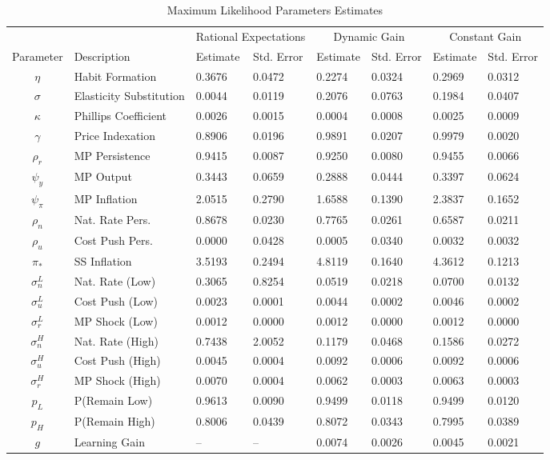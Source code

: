 \documentclass[12pt]{article}
\begin{document}
\begin{table}\label{tb:parms}\caption{Maximum Likelihood Parameters Estimates}\vspace{2pc}\hspace{4pc}
\begin{tabular}{|c|l|ll|ll|ll|}\hline
 & & \multicolumn{2}{|c|}{Rational Expectations} & \multicolumn{2}{|c|}{Dynamic Gain} & \multicolumn{2}{|c|}{Constant Gain} \\ 
Parameter & Description & Estimate & Std. Error & Estimate & Std. Error & Estimate & Std. Error \\ \hline 
$\eta$ & Habit Formation & 0.3676 & 0.0472 & 0.2274 & 0.0324 & 0.2969 & 0.0312 \\ 
$\sigma$ & Elasticity Substitution & 0.0044 & 0.0119 & 0.2076 & 0.0763 & 0.1984 & 0.0407 \\ 
$\kappa$ & Phillips Coefficient & 0.0026 & 0.0015 & 0.0004 & 0.0008 & 0.0025 & 0.0009 \\ 
$\gamma$ & Price Indexation & 0.8906 & 0.0196 & 0.9891 & 0.0207 & 0.9979 & 0.0020 \\ 
$\rho_r$ & MP Persistence & 0.9415 & 0.0087 & 0.9250 & 0.0080 & 0.9455 & 0.0066 \\ 
$\psi_y$ & MP Output & 0.3443 & 0.0659 & 0.2888 & 0.0444 & 0.3397 & 0.0624 \\ 
$\psi_{\pi}$ & MP Inflation & 2.0515 & 0.2790 & 1.6588 & 0.1390 & 2.3837 & 0.1652 \\ 
$\rho_{n}$ & Nat. Rate Pers.& 0.8678 & 0.0230 & 0.7765 & 0.0261 & 0.6587 & 0.0211 \\ 
$\rho_{u}$ & Cost Push Pers.& 0.0000 & 0.0428 & 0.0005 & 0.0340 & 0.0032 & 0.0032 \\ 
$\pi_{*}$ & SS Inflation & 3.5193 & 0.2494 & 4.8119 & 0.1640 & 4.3612 & 0.1213 \\ 
$\sigma_{n}^{L}$ & Nat. Rate (Low)& 0.3065 & 0.8254 & 0.0519 & 0.0218 & 0.0700 & 0.0132 \\ 
$\sigma_{u}^{L}$ & Cost Push (Low)& 0.0023 & 0.0001 & 0.0044 & 0.0002 & 0.0046 & 0.0002 \\ 
$\sigma_{r}^{L}$ & MP Shock (Low)& 0.0012 & 0.0000 & 0.0012 & 0.0000 & 0.0012 & 0.0000 \\ 
$\sigma_{n}^{H}$ & Nat. Rate (High)& 0.7438 & 2.0052 & 0.1179 & 0.0468 & 0.1586 & 0.0272 \\ 
$\sigma_{u}^{H}$ & Cost Push (High)& 0.0045 & 0.0004 & 0.0092 & 0.0006 & 0.0092 & 0.0006 \\ 
$\sigma_{r}^{H}$ & MP Shock (High)& 0.0070 & 0.0004 & 0.0062 & 0.0003 & 0.0063 & 0.0003 \\ 
$p_{L}$ & P(Remain Low) & 0.9613 & 0.0090 & 0.9499 & 0.0118 & 0.9499 & 0.0120 \\ 
$p_{H}$ & P(Remain High) & 0.8006 & 0.0439 & 0.8072 & 0.0343 & 0.7995 & 0.0389 \\ 
$g$ & Learning Gain & -- & -- & 0.0074 & 0.0026 & 0.0045 & 0.0021 \\ \hline 
\end{tabular}
\end{table}
\end{document}
